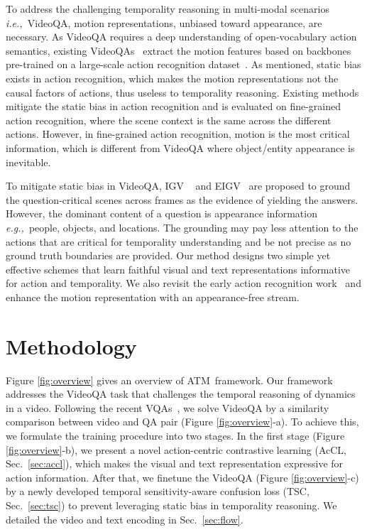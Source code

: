 \documentclass[sigconf]{acmart}
\newcommand{\methodname}{ATM~}
\newcommand{\ie}{\emph{i.e.,~}}
\newcommand{\eg}{\emph{e.g.,~}}
\begin{document}
To address the challenging temporality reasoning in multi-modal scenarios \ie VideoQA, 
motion representations, unbiased toward appearance, are necessary. 
As VideoQA requires a deep understanding of open-vocabulary action semantics, existing VideoQAs~\cite{le2020hierarchical,xiao2022hqga} extract the motion features based on backbones pre-trained on a large-scale action recognition dataset~\cite{carreira2017quo}. 
As mentioned, static bias exists in action recognition, which makes the motion representations not the causal factors of actions, thus useless to temporality reasoning. Existing methods\cite{choi2019can,li2018resound} mitigate the static bias in action recognition and is evaluated on fine-grained action recognition\cite{shao2020finegym,li2018resound}, where the scene context is the same across the different actions. However, in fine-grained action recognition, motion is the most critical information, which is different from VideoQA where object/entity appearance is inevitable. 

To mitigate static bias in VideoQA, IGV ~\cite{li2022invariant} and EIGV~\cite{li2022equivariant} are proposed to ground the question-critical scenes across frames as the evidence of yielding the answers. 
However, the dominant content of a question is appearance information \eg people, objects, and locations. The grounding may pay less attention to the actions that are critical for temporality understanding and be not precise as no ground truth boundaries are provided. Our method designs two simple yet effective schemes that learn faithful visual and text representations informative for action and temporality. We also revisit the early action recognition work~\cite{wang2016temporal,carreira2017quo} and enhance the motion representation with an appearance-free stream.





 




 \section{Methodology}



Figure \ref{fig:overview} gives an overview of \methodname framework. Our framework addresses the VideoQA task that challenges the temporal reasoning of dynamics in a video. 
Following the recent VQAs~\cite{yang2021just,xiao2022vgt}, we solve VideoQA by a similarity comparison between video and QA pair (Figure \ref{fig:overview}-a). 
To achieve this, we formulate the training procedure into two stages.
In the first stage (Figure \ref{fig:overview}-b), we present a novel action-centric contrastive learning (AcCL, Sec.~\ref{sec:accl}), which makes the visual and text representation expressive for action information. 
After that, we finetune the VideoQA (Figure \ref{fig:overview}-c) by a newly developed temporal sensitivity-aware confusion loss (TSC, Sec.~\ref{sec:tsc}) to prevent leveraging static bias in temporality reasoning. We detailed the video and text encoding in Sec.~\ref{sec:flow}.
\end{document}
